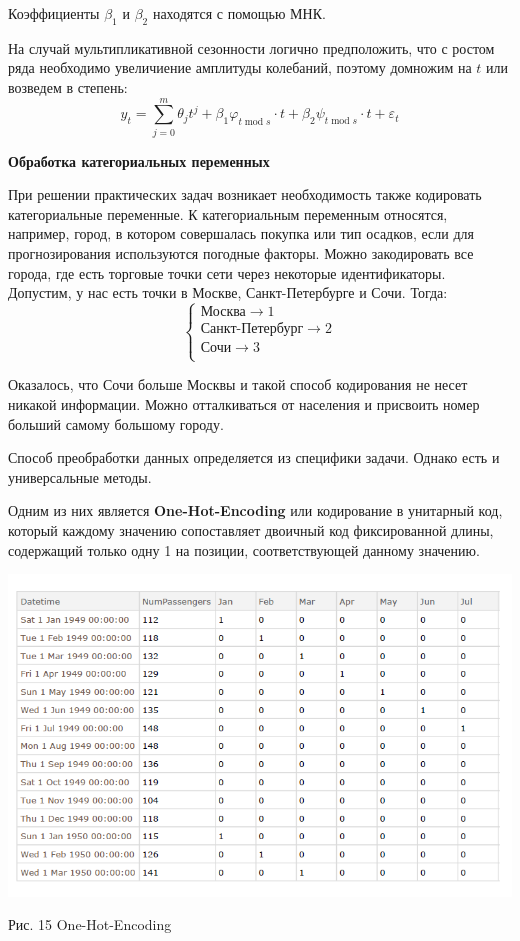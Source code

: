 \documentclass[aps,%
12pt,%
final,%
oneside,
onecolumn,%
musixtex, %
superscriptaddress,%
centertags]{article} %
\theoremstyle{plain}
\theoremstyle{definition}
\theoremstyle{remark}
\begin{document}
Коэффициенты $\beta_1$ и $\beta_2$ находятся с помощью МНК.

На случай мультипликативной сезонности логично предположить, что с ростом ряда необходимо увеличиение амплитуды колебаний, поэтому домножим на $t$ или возведем в степень:
$$y_t = \sum\limits_{j=0}^m \theta_jt^j + \beta_1 \varphi_{t \operatorname{mod} s} \cdot t + \beta_2 \psi_{t \operatorname{mod} s} \cdot t+ \varepsilon_t$$

\textbf{Обработка категориальных переменных}

При решении практических задач возникает необходимость также кодировать
категориальные переменные. К категориальным переменным относятся, например,
город, в котором совершалась покупка или тип осадков, если для прогнозирования
используются погодные факторы. Можно закодировать все города, где есть торговые
точки сети через некоторые идентификаторы. Допустим, у нас есть точки в Москве,
Санкт-Петербурге и Сочи. Тогда:
$$\begin{cases}
	\text{Москва} \to 1 \\
	\text{Санкт-Петербург} \to 2 \\
	\text{Сочи} \to 3 \\
\end{cases}$$

Оказалось, что Сочи больше Москвы и такой способ кодирования не несет никакой информации. Можно отталкиваться от населения и присвоить номер больший самому большому городу.

Способ преобработки данных определяется из специфики задачи. Однако есть и универсальные методы.

Одним из них является \textbf{One-Hot-Encoding} или кодирование в унитарный код, который
каждому значению сопоставляет двоичный код фиксированной длины, содержащий
только одну 1 на позиции, соответствующей данному значению.

\begin{center}
	\includegraphics[scale=0.5]{images/15.png}

	Рис. 15 One-Hot-Encoding
\end{center}
\end{document}
